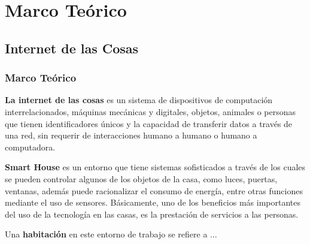 \section{Marco Teórico}

\begin{frame}
\subsection{Internet de las Cosas}
\frametitle{Marco Teórico}

\small
\textbf{La internet de las cosas} es un sistema de dispositivos de computación interrelacionados, máquinas mecánicas y digitales, objetos, animales o personas que tienen identificadores únicos y la capacidad de transferir datos a través de una red, sin requerir de interacciones humano a humano o humano a computadora. \newline

\textbf{Smart House} es un entorno que tiene sistemas sofisticados a través de los cuales se pueden controlar algunos de los objetos de la casa, como luces, puertas, ventanas, además puede racionalizar el consumo de energía, entre otras funciones mediante el uso de sensores. Básicamente, uno de los beneficios más importantes del uso de la tecnología en las casas, es la prestación de servicios a las personas.\cite{Howedi2016}\newline

Una \textbf{habitación} en este entorno de trabajo se refiere a ...
\end{frame}